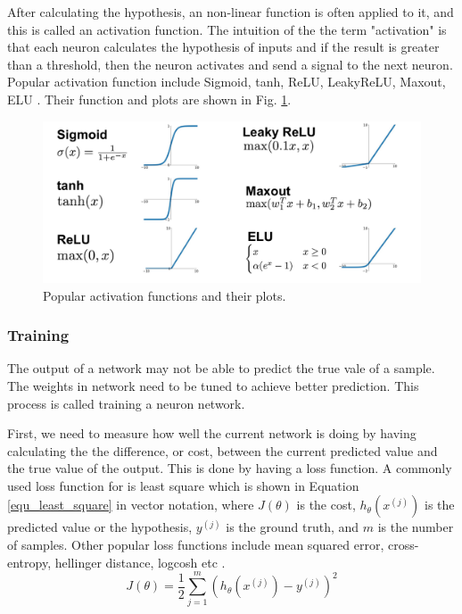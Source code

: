 After calculating the hypothesis, an non-linear function is often applied to it, and this is called an activation function. The intuition of the the term "activation" is that each neuron calculates the hypothesis of inputs and if the result is greater than a threshold, then the neuron activates and send a signal to the next neuron. Popular activation function include Sigmoid, tanh, ReLU, LeakyReLU, Maxout, ELU \cite{goodfellow2016deep}. Their function and plots are shown in Fig. \ref{fig_activation_func}.
\begin{figure}[h!]
\begin{center}
\includegraphics[width = 13cm]{img/activation_function.png}
\caption{Popular activation functions and their plots.\label{fig_activation_func}}
\end{center}
\end{figure}

\subsubsection{Training}
The output of a network may not be able to predict the true vale of a sample. The weights in network need to be tuned to achieve better prediction. This process is called training a neuron network.

First, we need to measure how well the current network is doing by having calculating the the difference, or cost, between the current predicted value and the true value of the output. This is done by having a loss function. A commonly used loss function for is least square which is shown in Equation \ref{equ_least_square} in vector notation, where $J(\theta)$ is the cost, $h_\theta(x^{(j)})$ is the predicted value or the hypothesis, $y^{(j)}$ is the ground truth, and $m$ is the number of samples. Other popular loss functions include mean squared error, cross-entropy, hellinger distance, logcosh etc \cite{goodfellow2016deep}.
\begin{equation}
J(\theta)=\frac{1}{2}\sum^m_{j=1}(h_\theta(x^{(j)}) - y^{(j)})^2
 \label{equ_least_square}
\end{equation}

